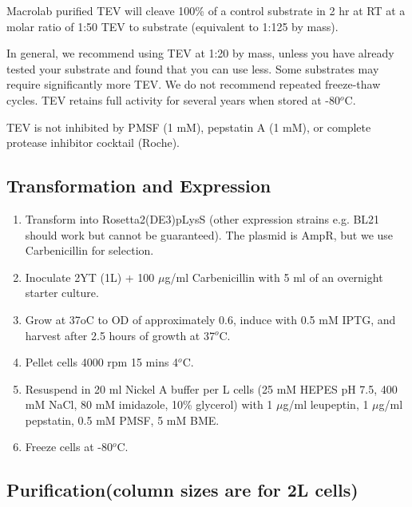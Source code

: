 \documentclass{tufte-book} %
\begin{document}
Macrolab purified TEV will cleave 100\% of a control substrate in 2 hr at RT at a molar ratio of 1:50 TEV to substrate (equivalent to 1:125 by mass).

In general, we recommend using TEV at 1:20 by mass, unless you have already tested your substrate and found that you can use less. Some substrates may require significantly more TEV. We do not recommend repeated freeze-thaw cycles. TEV retains full activity for several years when stored at -80$^{o}$C.

TEV is not inhibited by PMSF (1 mM), pepstatin A (1 mM), or complete protease inhibitor cocktail (Roche).


\subsection{Transformation and Expression}

\begin{enumerate}
\item Transform into Rosetta2(DE3)pLysS (other expression strains e.g. BL21 should work but cannot be guaranteed). The plasmid is AmpR, but we use Carbenicillin for selection.
\item Inoculate 2YT (1L) + 100 $\mu$g/ml Carbenicillin with 5 ml of an overnight starter culture.
\item Grow at 37oC to OD of approximately 0.6, induce with 0.5 mM IPTG, and harvest after 2.5 hours of growth at 37$^{o}$C.
\item Pellet cells 4000 rpm 15 mins 4$^{o}$C.
\item Resuspend in 20 ml Nickel A buffer per L cells (25 mM HEPES pH 7.5, 400 mM NaCl, 80 mM imidazole, 10\% glycerol) with 1 $\mu$g/ml leupeptin, 1 $\mu$g/ml pepstatin, 0.5 mM PMSF, 5 mM BME.
\item Freeze cells at -80$^{o}$C.
\end{enumerate}
 
\subsection{Purification(column sizes are for 2L cells)}
\end{document}
